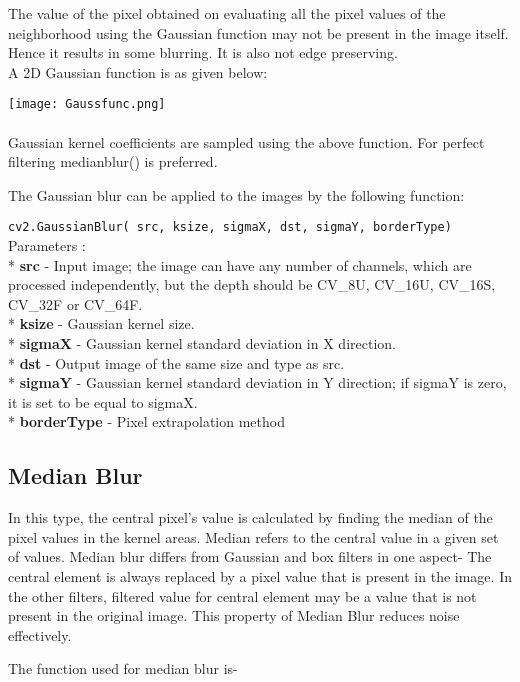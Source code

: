 \documentclass[]{article}
\begin{document}
The value of the pixel obtained on evaluating all the pixel values of
the neighborhood using the Gaussian function may not be present in the
image itself. Hence it results in some blurring. It is also not edge
preserving.\\
A 2D Gaussian function is as given below:

\texttt{[image: Gaussfunc.png]}\\
\\
Gaussian kernel coefficients are sampled using the above function. For
perfect filtering medianblur() is preferred.

The Gaussian blur can be applied to the images by the following
function:

\texttt{cv2.GaussianBlur(\ src,\ ksize,\ sigmaX,\ dst,\ sigmaY,\ borderType)}\\

\large Parameters : \\
* \textbf{src} - Input image; the image can have any number of channels,
which are processed independently, but the depth should be CV\_8U,
CV\_16U, CV\_16S, CV\_32F or CV\_64F.\\
* \textbf{ksize} - Gaussian kernel size.\\
* \textbf{sigmaX} - Gaussian kernel standard deviation in X direction.\\
* \textbf{dst} - Output image of the same size and type as src.\\
* \textbf{sigmaY} - Gaussian kernel standard deviation in Y direction;
if sigmaY is zero, it is set to be equal to sigmaX.\\
* \textbf{borderType} - Pixel extrapolation method

\subsection{Median Blur}\label{median-blur}

In this type, the central pixel's value is calculated by finding the
median of the pixel values in the kernel areas. Median refers to the
central value in a given set of values. Median blur differs from
Gaussian and box filters in one aspect- The central element is always
replaced by a pixel value that is present in the image. In the other
filters, filtered value for central element may be a value that is not
present in the original image. This property of Median Blur reduces
noise effectively.

The function used for median blur is-
\end{document}
